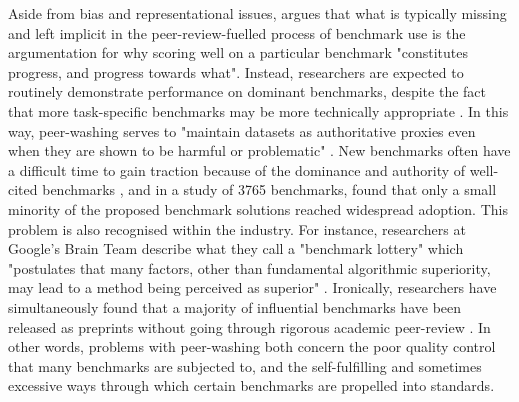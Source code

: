 Aside from bias and representational issues, \citet[p.~1]{schlangen_targeting_2020} argues that what is typically missing and left implicit in the peer-review-fuelled process of benchmark use is the argumentation for why scoring well on a particular benchmark "constitutes progress, and progress towards what". Instead, researchers are expected to routinely demonstrate performance on dominant benchmarks, despite the fact that more task-specific benchmarks may be more technically appropriate \cite{koch2021}. In this way, peer-washing serves to "maintain datasets as authoritative proxies even when they are shown to be harmful or problematic" \cite[p.~4966]{orr2024}. New benchmarks often have a difficult time to gain traction because of the dominance and authority of well-cited benchmarks \cite{jaton2021}, and in a study of 3765 benchmarks, \citet{ott2022} found that only a small minority of the proposed benchmark solutions reached widespread adoption. This problem is also recognised within the industry. For instance, researchers at Google's Brain Team describe what they call a "benchmark lottery" which "postulates that many factors, other than fundamental algorithmic superiority, may lead to a method being perceived as superior" \cite[p.~1]{dehghani2021}. Ironically, researchers have simultaneously found that a majority of influential benchmarks have been released as preprints without going through rigorous academic peer-review \cite[p.~6]{mcintosh2024}. In other words, problems with peer-washing both concern the poor quality control that many benchmarks are subjected to, and the self-fulfilling and sometimes excessive ways through which certain benchmarks are propelled into standards. %

